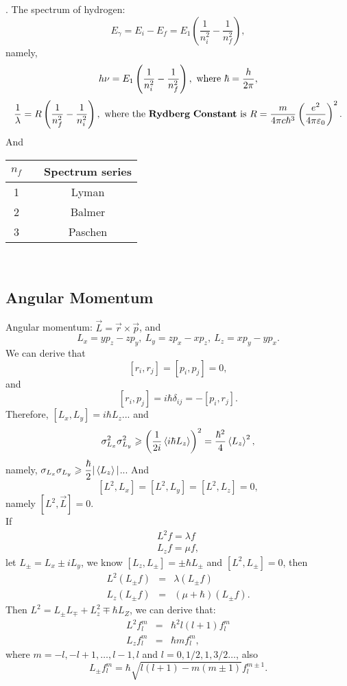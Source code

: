 \documentclass[12pt, 
]{article}
\begin{document}
. The spectrum of hydrogen:
\[
	E_\gamma=E_i-E_f=E_1\left(\frac{1}{n_i^2}-\frac{1}{n_f^2}\right),
\]
namely,
\[
	h\nu=E_1\left(\frac{1}{n_i^2}-\frac{1}{n_f^2}\right), ~{\rm where}~\hbar=\frac{h}{2\pi},
\]
\[
	\frac{1}{\lambda}=R\left(\frac{1}{n_f^2}-\frac{1}{n_i^2}\right),~{\rm where~the~{\bf Rydberg~Constant}~is}~R=\frac{m}{4\pi c\hbar^3}\left(\frac{e^2}{4\pi\varepsilon_0}\right)^2.
\]
And 
\begin{table}[h]
	\centering
	\begin{tabular}{ccc}
	\hline\hline
		$n_f$&&Spectrum series\\
	\hline
		1&&Lyman\\
		2&&Balmer\\
		3&&Paschen\\
	\hline\hline
	\end{tabular}
\end{table}
~\\

\subsection{Angular Momentum}
Angular momentum: $\vec{L}=\vec{r}\times\vec{p}$, and 
\[
	L_x=yp_z-zp_y,~L_y=zp_x-xp_z,~L_z=xp_y-yp_x.
\]
We can derive that
\[
	[r_i,r_j]=[p_i,p_j]=0,
\]
and \[
	[r_i, p_j]=i\hbar\delta_{ij}=-[p_i,r_j].	
\]
Therefore, $[L_x, L_y]=i\hbar L_z$...
and
\[
	\sigma_{L_x}^2\sigma_{L_y}^2\geqslant\left(\frac{1}{2i}\braket{i\hbar L_z}\right)^2=\frac{\hbar^2}{4}\braket{L_z}^2,
\]
namely, $\sigma_{L_x}\sigma_{L_y}\geqslant\dfrac{\hbar}{2}|\braket{L_z}|$...
And \[
	[L^2,L_x]=[L^2,L_y]=[L^2,L_z]=0,
\]
namely $[L^2,\vec{L}]=0$.\\
If 
\begin{eqnarray*}
	L^2f=\lambda f\\
	L_zf=\mu f,
\end{eqnarray*}
let $L_\pm=L_x\pm iL_y$, we know $[L_z,L_\pm]=\pm\hbar L_\pm$ and $[L^2, L_\pm]=0$, then
\begin{eqnarray*}
	L^2(L_\pm f)&=&\lambda(L_\pm f)\\
	L_z(L_\pm f)&=&(\mu+\hbar)(L_\pm f).
\end{eqnarray*}
Then $L^2=L_\pm L_\mp +L_z^2\mp\hbar L_Z$, we can derive that:
\begin{eqnarray*}
	L^2f_l^m&=&\hbar^2l(l+1)f_l^m\\
	L_zf_l^m&=&\hbar mf_l^m,
\end{eqnarray*}
where $m=-l, -l+1,\dots,l-1,l$ and $l=0,1/2,1,3/2\dots$, also
\begin{equation}\label{eq:22}
	L_\pm f_l^m=\hbar\sqrt{l(l+1)-m(m\pm1)}f_l^{m\pm 1}.
\end{equation}~\\
\end{document}
